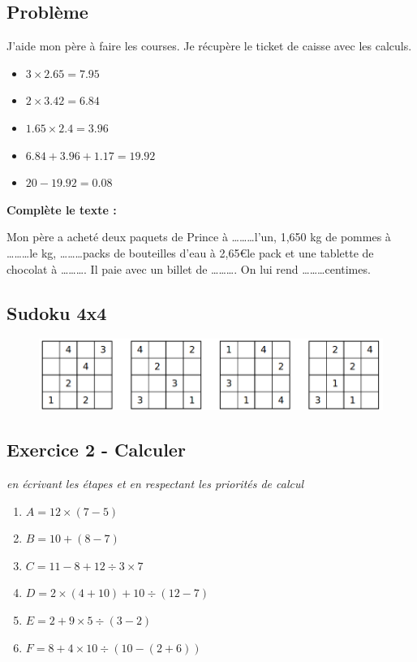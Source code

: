 \subsection*{Problème}

J'aide mon père à faire les courses. Je récupère le ticket de caisse avec les calculs.
\begin{itemize}
  \item $3 \times 2.65 = 7.95$
  \item $2 \times 3.42 = 6.84$
  \item $1.65 \times 2.4 = 3.96$
  \item $6.84 + 3.96 + 1.17 = 19.92$
  \item $20 - 19.92 = 0.08$
\end{itemize}

\textbf{Complète le texte : }

Mon père a acheté deux paquets de Prince à \ldots\ldots\ldots l'un, 1,650 kg de pommes à \ldots\ldots\ldots le kg, \ldots\ldots\ldots packs de bouteilles d'eau à 2,65\euro le pack et une tablette de chocolat à \ldots\ldots\ldots . Il paie avec un billet de \ldots\ldots\ldots . On lui rend \ldots\ldots\ldots centimes.

\subsection*{Sudoku 4x4}

\begin{figure}[H]
  \centering
  \includegraphics[width=0.8\linewidth]{5x1-calculs/sudoku-4a.png}
\end{figure}

\newpage

\subsection*{Exercice 2 - Calculer}
\textit{en écrivant les étapes et en respectant les priorités de calcul}

\begin{multicols}{3}\noindent

  \begin{enumerate}
    \item $A = 12 \times (7-5)$ 
    \item $B = 10 + (8 - 7)$ 
    \item $C = 11 - 8 + 12 \div 3 \times 7$ 
    \item $D = 2 \times (4+10) + 10 \div (12-7)$ 
    \item $E = 2 + 9 \times 5 \div (3-2)$ 
    \item $F = 8 + 4 \times 10\div (10-(2+6))$ 
  \end{enumerate}

\end{multicols}

